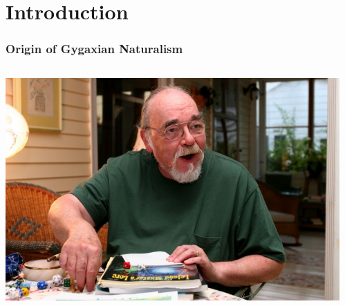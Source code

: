 \documentclass{beamer}\usepackage{graphicx, color}
\begin{document}
\section{Introduction}
\begin{frame}
  \frametitle{Origin of Gygaxian Naturalism}
  \begin{columns}
    \begin{column}{0.5\textwidth}
      \includegraphics[width = \textwidth, keepaspectratio = true]{gygax}
    \end{column}
    \begin{column}{0.5\textwidth}

\end{column}
\end{columns}
\end{frame}
\end{document}
